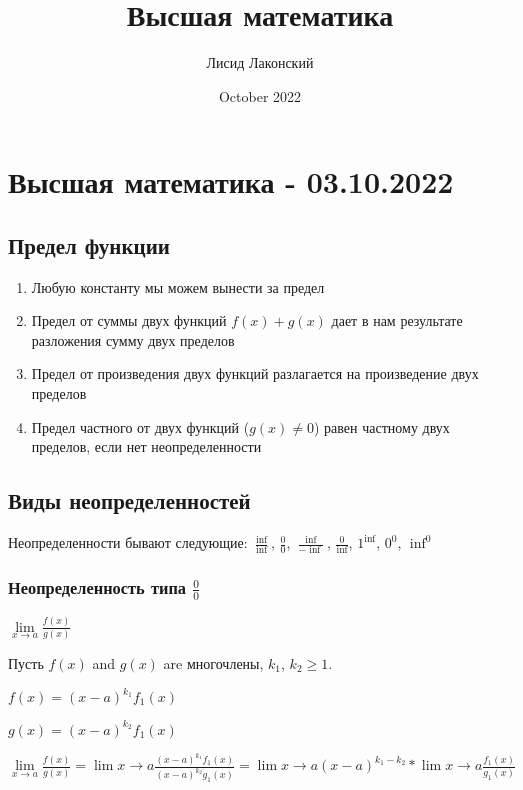 \documentclass{article}
\title{Высшая математика}
\author{Лисид Лаконский}
\date{October 2022}
\begin{document}
\maketitle

\tableofcontents
\pagebreak

\section{Высшая математика - 03.10.2022}

\subsection{Предел функции}

\begin{enumerate}
    \item Любую константу мы можем вынести за предел
    \item Предел от суммы двух функций $f(x) + g(x)$ дает в нам результате разложения сумму двух пределов
    \item Предел от произведения двух функций разлагается на произведение двух пределов
    \item Предел частного от двух функций ($g(x) \ne 0$) равен частному двух пределов, если нет неопределенности
\end{enumerate}

\subsection{Виды неопределенностей}

Неопределенности бывают следующие: $\frac{\inf}{\inf}$, $\frac{0}{0}$, $\frac{\inf}{-\inf}$, $\frac{0}{\inf}$, $1^{\inf}$, $0^{0}$, $\inf^{0}$

\subsubsection{Неопределенность типа $\frac{0}{0}$}

$\lim\limits_{x \to a} \frac{f(x)}{g(x)}$

Пусть $f(x)$ and $g(x)$ are многочлены, $k_1$, $k_2 \ge 1$.

$f(x) = (x - a)^{k_1} f_{1}(x)$

$g(x) = (x-a)^{k_2} f_{1}(x)$

$\lim\limits_{x \to a} \frac{f(x)}{g(x)} = \lim{x \to a} \frac{(x- a)^{k_1} f_{1}(x)}{(x-a)^{k_2}g_{1}(x)} = \lim{x \to a} (x - a)^{k_1 - k_2} * \lim{x \to a} \frac{f_{1}(x)}{g_{1}(x)}$
\end{document}
